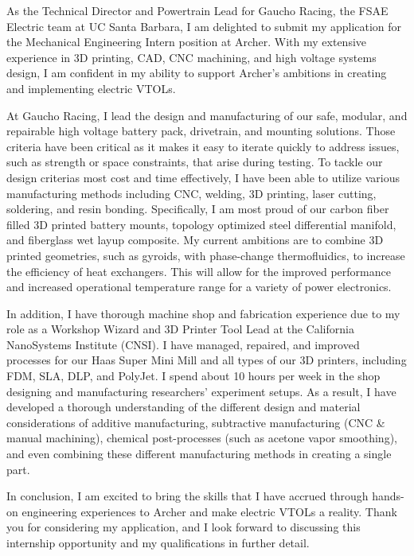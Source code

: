 \documentclass[11pt, letterpaper]{awesome-cv} %
\begin{document}
\makecvheader %

\makelettertitle %


\begin{cvletter}


As the Technical Director and Powertrain Lead for Gaucho Racing, the FSAE Electric team at UC Santa Barbara, I am delighted to submit my application for the Mechanical Engineering Intern position at Archer. With my extensive experience in 3D printing, CAD, CNC machining, and high voltage systems design, I am confident in my ability to support Archer's ambitions in creating and implementing electric VTOLs.

At Gaucho Racing, I lead the design and manufacturing of our safe, modular, and repairable high voltage battery pack, drivetrain, and mounting solutions. Those criteria have been critical as it makes it easy to iterate quickly to address issues, such as strength or space constraints, that arise during testing. To tackle our design criterias most cost and time effectively, I have been able to utilize various manufacturing methods including CNC, welding, 3D printing, laser cutting, soldering, and resin bonding. Specifically, I am most proud of our carbon fiber filled 3D printed battery mounts, topology optimized steel differential manifold, and fiberglass wet layup composite. My current ambitions are to combine 3D printed geometries, such as gyroids, with phase-change thermofluidics, to increase the efficiency of heat exchangers. This will allow for the improved performance and increased operational temperature range for a variety of power electronics.

In addition, I have thorough machine shop and fabrication experience due to my role as a Workshop Wizard and 3D Printer Tool Lead at the California NanoSystems Institute (CNSI). I have managed, repaired, and improved processes for our Haas Super Mini Mill and all types of our 3D printers, including FDM, SLA, DLP, and PolyJet. I spend about 10 hours per week in the shop designing and manufacturing researchers' experiment setups. As a result, I have developed a thorough understanding of the different design and material considerations of additive manufacturing, subtractive manufacturing (CNC \& manual machining), chemical post-processes (such as acetone vapor smoothing), and even combining these different manufacturing methods in creating a single part.

In conclusion, I am excited to bring the skills that I have accrued through hands-on engineering experiences to Archer and make electric VTOLs a reality. Thank you for considering my application, and I look forward to discussing this internship opportunity and my qualifications in further detail.


\end{cvletter}


\makeletterclosing %
\end{document}
